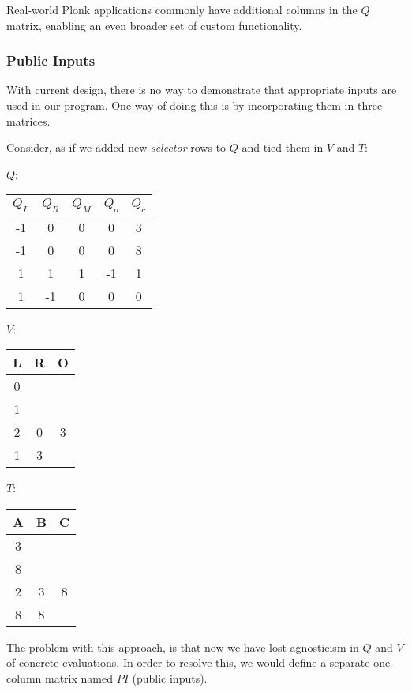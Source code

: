 \documentclass[../lecture-notes.tex]{subfiles}
\begin{document}
\begin{remark}
Real-world Plonk applications commonly have additional columns in the $Q$ matrix, enabling an even broader set of custom functionality.
\end{remark}

\subsubsection{Public Inputs}
With current design, there is no way to demonstrate that appropriate inputs are used in our program. One way of doing this is by incorporating them in three matrices.

\begin{example}
Consider, as if we added new \textit{selector} rows to $Q$ and tied them in $V$ and $T$:

\begin{center}
$Q$: 
\begin{tabular}{|c|c|c|c|c|}
\hline
$Q_L$ & $Q_R$ & $Q_M$ & $Q_o$ & $Q_c$ \\ 
\hline
-1 & 0 & 0 & 0 & 3 \\ 
\hline
-1 & 0 & 0 & 0 & 8 \\ 
\hline
1 & 1 & 1 & -1 & 1 \\ 
\hline
1 & -1 & 0 & 0 & 0 \\ 
\hline
\end{tabular}
\quad $V$:
\begin{tabular}{|c|c|c|}
\hline
L & R & O \\
\hline
0 &  &  \\
\hline
1 &  &  \\
\hline
2 & 0 & 3 \\
\hline
1 & 3 &  \\
\hline
\end{tabular}
\quad $T$:
\begin{tabular}{|c|c|c|}
\hline
A & B & C \\
\hline
3 &  &  \\
\hline
8 &  &  \\
\hline
2 & 3 & 8 \\
\hline
8 & 8 &  \\
\hline
\end{tabular}
\end{center}
\end{example}

The problem with this approach, is that now we have lost agnosticism in $Q$ and $V$ of concrete evaluations. In order to resolve this, we would define a separate one-column matrix named $PI$ (public inputs).
\end{document}
